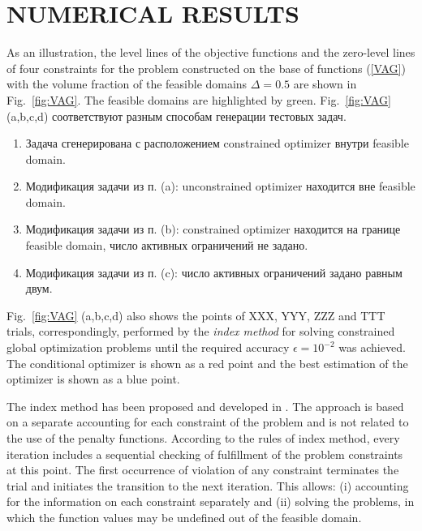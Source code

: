 \documentclass{aip-cp}
\begin{document}
\section{NUMERICAL RESULTS}

As an illustration, the level lines of the objective functions and the zero-level lines of four constraints for the problem constructed on the base of functions (\ref{VAG}) with the volume fraction of the feasible domains $\Delta = 0.5$ are shown in Fig.~\ref{fig:VAG}. The feasible domains are highlighted by green. 
\Russian
Fig.~\ref{fig:VAG} (a,b,c,d) соответствуют разным способам генерации тестовых задач.

\begin{enumerate}[label=(\alph*)]
	\item Задача сгенерирована с расположением constrained optimizer внутри feasible domain.
	\item Модификация задачи из п. (a): unconstrained optimizer находится вне feasible domain.
	\item Модификация задачи из п. (b): constrained optimizer находится на границе feasible domain, число активных ограничений не задано.
	\item Модификация задачи из п. (c): число активных ограничений задано равным двум.
\end{enumerate}


Fig.~\ref{fig:VAG} (a,b,c,d) also shows the points of XXX, YYY, ZZZ and TTT trials, correspondingly, performed by the \textit{index method} for solving constrained global optimization problems until the required accuracy $\epsilon=10^{-2}$ was achieved. The conditional optimizer is shown as a red point and the best estimation of the optimizer is shown as a blue point.

The index method has been proposed and developed in \cite{Strongin2000,Sergeyev2001,Barkalov2002}. The approach is based on a separate accounting for each constraint of the problem and is not related to the use of the penalty functions. According to the rules of index method, every iteration includes a sequential checking of fulfillment of the problem constraints at this point. The first occurrence of violation of any constraint terminates the trial and initiates the transition to the next iteration. This allows: (i) accounting for the information on each constraint separately and (ii) solving the problems, in which the function values may be undefined out of the feasible domain. 
\end{document}
